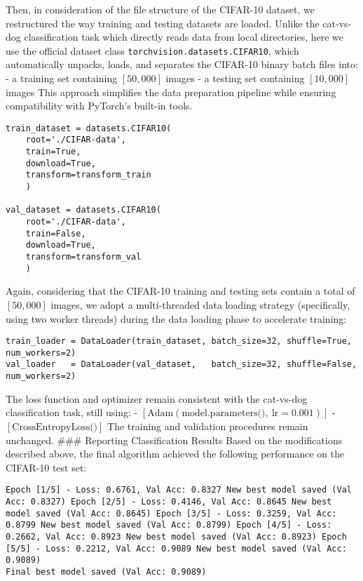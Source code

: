 Then, in consideration of the file structure of the CIFAR-10 dataset, we
restructured the way training and testing datasets are loaded. Unlike
the cat-vs-dog classification task which directly reads data from local
directories, here we use the official dataset class
\texttt{torchvision.datasets.CIFAR10}, which automatically unpacks,
loads, and separates the CIFAR-10 binary batch files into: - a training
set containing \([50{,}000]\) images - a testing set containing
\([10{,}000]\) images This approach simplifies the data preparation
pipeline while ensuring compatibility with PyTorch's built-in tools.

\begin{verbatim}
train_dataset = datasets.CIFAR10(
    root='./CIFAR-data',
    train=True,
    download=True,
    transform=transform_train
    )
    
val_dataset = datasets.CIFAR10(
    root='./CIFAR-data',
    train=False,
    download=True,
    transform=transform_val
    )
\end{verbatim}

Again, considering that the CIFAR-10 training and testing sets contain a
total of \([50{,}000]\) images, we adopt a multi-threaded data loading
strategy (specifically, using two worker threads) during the data
loading phase to accelerate training:

\begin{verbatim}
train_loader = DataLoader(train_dataset, batch_size=32, shuffle=True, num_workers=2)
val_loader   = DataLoader(val_dataset,   batch_size=32, shuffle=False, num_workers=2)
\end{verbatim}

The loss function and optimizer remain consistent with the cat-vs-dog
classification task, still using: -
\([\text{Adam}(\text{model.parameters()},\ \text{lr}=0.001)]\) -
\([\text{CrossEntropyLoss()}]\) The training and validation procedures
remain unchanged. \#\#\# Reporting Classification Results Based on the
modifications described above, the final algorithm achieved the
following performance on the CIFAR-10 test set:

\begin{verbatim}
Epoch [1/5] - Loss: 0.6761, Val Acc: 0.8327 New best model saved (Val Acc: 0.8327) Epoch [2/5] - Loss: 0.4146, Val Acc: 0.8645 New best model saved (Val Acc: 0.8645) Epoch [3/5] - Loss: 0.3259, Val Acc: 0.8799 New best model saved (Val Acc: 0.8799) Epoch [4/5] - Loss: 0.2662, Val Acc: 0.8923 New best model saved (Val Acc: 0.8923) Epoch [5/5] - Loss: 0.2212, Val Acc: 0.9089 New best model saved (Val Acc: 0.9089)
Final best model saved (Val Acc: 0.9089)
\end{verbatim}


